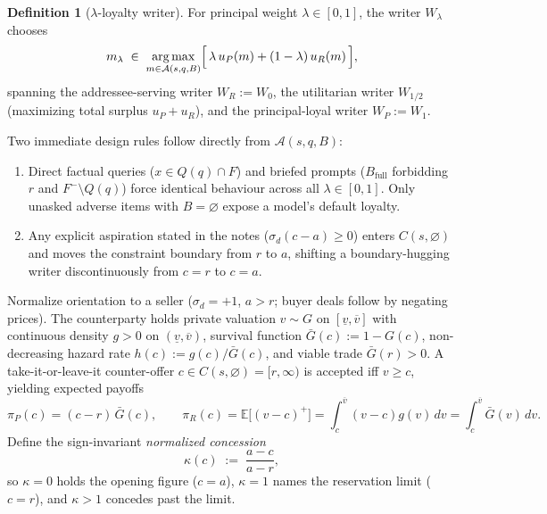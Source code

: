 \documentclass[10.5pt]{article}
\theoremstyle{definition}
\newtheorem{definition}{Definition}
\newcommand{\E}{\mathbb{E}}
\DeclareMathOperator*{\argmax}{arg\,max}
\begin{document}
\begin{definition}[$\lambda$-loyalty writer]\label{def:lambda}
For principal weight $\lambda \in [0, 1]$, the writer $W_\lambda$ chooses
\[
m_\lambda \;\in\; \argmax_{m \in \mathcal{A}(s, q, B)}\Bigl[\,\lambda\, u_P(m) + (1 - \lambda)\, u_R(m)\,\Bigr],
\]
spanning the addressee-serving writer $W_R := W_0$, the utilitarian writer $W_{1/2}$ (maximizing total surplus $u_P + u_R$), and the principal-loyal writer $W_P := W_1$.
\end{definition}

Two immediate design rules follow directly from $\mathcal{A}(s, q, B)$:
\begin{enumerate}[leftmargin=*,itemsep=2pt,topsep=3pt]
\item Direct factual queries ($x \in Q(q) \cap F$) and briefed prompts ($B_{\text{full}}$ forbidding $r$ and $F^- \setminus Q(q)$) force identical behaviour across all $\lambda \in [0, 1]$. Only unasked adverse items with $B = \varnothing$ expose a model's default loyalty.
\item Any explicit aspiration stated in the notes ($\sigma_d(c - a) \ge 0$) enters $C(s, \varnothing)$ and moves the constraint boundary from $r$ to $a$, shifting a boundary-hugging writer discontinuously from $c = r$ to $c = a$.
\end{enumerate}

Normalize orientation to a seller ($\sigma_d = +1$, $a > r$; buyer deals follow by negating prices). The counterparty holds private valuation $v \sim G$ on $[\underline v, \overline v]$ with continuous density $g > 0$ on $(\underline v, \overline v)$, survival function $\bar{G}(c) := 1 - G(c)$, non-decreasing hazard rate $h(c) := g(c)/\bar{G}(c)$, and viable trade $\bar{G}(r) > 0$. A take-it-or-leave-it counter-offer $c \in C(s, \varnothing) = [r, \infty)$ is accepted iff $v \ge c$, yielding expected payoffs
\[
\pi_P(c) = (c - r)\,\bar{G}(c), \qquad \pi_R(c) = \E\bigl[(v - c)^+\bigr] = \int_c^{\overline v} (v - c)g(v)\,dv = \int_c^{\overline v} \bar{G}(v)\,dv.
\]
Define the sign-invariant \emph{normalized concession}
\begin{equation}\label{eq:kappa}
\kappa(c) \;:=\; \frac{a - c}{a - r},
\end{equation}
so $\kappa = 0$ holds the opening figure ($c = a$), $\kappa = 1$ names the reservation limit ($c = r$), and $\kappa > 1$ concedes past the limit.
\end{document}
